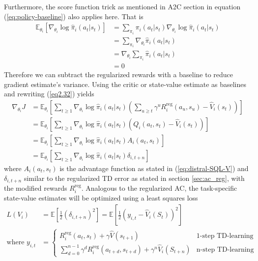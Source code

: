 \documentclass[12pt]{report}
\begin{document}
Furthermore, the score function trick as mentioned in A2C section in equation (\ref{eq:policy-baseline}) also applies here. That is
\begin{align}
    \mathbb{E}_{\theta_i}\left[\nabla_{\theta_i}\log \hat{\pi}_i(a_t|s_t)\right]&=\sum_{\pi_i}\pi_i(a_t|s_t)\nabla_{\theta_i}\log\hat{\pi}_i(a_t|s_t)\nonumber\\
    &=\sum_{\pi_i} \nabla_{\theta_i}\hat{\pi}_i(a_t|s_t)\nonumber\\
    &=\nabla_{\theta_i}\sum_{\pi_i}\hat{\pi}_i(a_t|s_t)\nonumber\\
    &=0\nonumber
\end{align}
Therefore we can subtract the regularized rewards with a baseline to reduce gradient estimate's variance. Using the critic or state-value estimate as baselines and rewriting (\ref{eq2.32}) yields
\begin{align}
    \nabla_{\theta_i}J &= \mathbb{E}_{\theta_i}\left[\sum_{t\ge1}\nabla_{\theta_i}\log \hat{\pi}_i(a_t|s_t)\left(\sum_{u\ge t}\gamma^u R_i^{\text{reg}}(a_u,s_u) - \hat{V}_i(s_t)\right)\right]\nonumber\\
    &= \mathbb{E}_{\theta_i}\left[\sum_{t\ge1}\nabla_{\theta_i}\log \hat{\pi}_i(a_t|s_t)\left(Q_i(a_t,s_t)- \hat{V}_i(s_t)\right)\right]\nonumber\\
    &= \mathbb{E}_{\theta_i}\left[\sum_{t\ge1}\nabla_{\theta_i}\log \hat{\pi}_i(a_t|s_t)A_i(a_t,s_t)\right]\\
    &= \mathbb{E}_{\theta_i}\left[\sum_{t\ge1}\nabla_{\theta_i}\log \hat{\pi}_i(a_t|s_t)\delta_{i,t+n}\right]\label{eq2.35}
\end{align}
where $A_i(a_t,s_t)$ is the advantage function as stated in (\ref{eq:distral-SQL-V}) and $\delta_{i,t+n}$ similar to the regularized TD error as stated in section \ref{sec:ac_reg}, with the modified rewards $R_i^{\text{reg}}$. Analogous to the regularized AC, the task-specific state-value estimates will be optimized using a least squares loss 
\begin{align}
    L(V_i) &= \mathbb{E}\left[\frac{1}{2}(\delta_{i,t+n})^2\right]=\mathbb{E}\left[\frac{1}{2}\left(y_{i,t}-\hat{V}_i(S_t)\right)^2\right]\\
    \text{where } y_{i,t} &= \begin{cases} R_i^{\text{reg}}(a_t,s_t) + \gamma \hat{V}(s_{t+1})&\mbox{1-step TD-learning} \\
    \sum_{d=0}^{n-1} \gamma^d R_i^{\text{reg}}(a_{t+d},s_{t+d}) + \gamma^n \hat{V}_i(S_{t+n}) & \mbox{n-step TD-learning} \end{cases}
\end{align}
\end{document}
